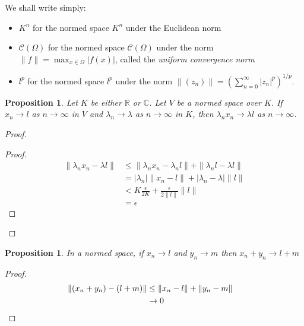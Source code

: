 \documentclass{book}
\let\qed\relax
\newtheorem{prop}[ax]{Proposition}
\theoremstyle{definition}
\begin{document}
We shall write simply:
\begin{itemize}
\item $K^n$ for the normed space $K^n$ under the Euclidean norm
\item $\mathcal{C}(\Omega)$ for the normed space $\mathcal{C}(\Omega)$ under the norm $\| f \| = \max_{x \in \Omega} |f(x)|$, called the \emph{uniform convergence norm}
\item $l^p$ for the normed space $l^p$ under the norm $\| (z_n) \| = \left( \sum_{n=0}^\infty |z_n|^p \right)^{1/p}$.
\end{itemize}

\begin{prop}
Let $K$ be either $\mathbb{R}$ or $\mathbb{C}$.
Let $V$ be a normed space over $K$. If $x_n \rightarrow l$ as $n \rightarrow \infty$ in $V$ and $\lambda_n \rightarrow \lambda$ as $n \rightarrow \infty$ in $K$, then $\lambda_n x_n \rightarrow \lambda l$ as $n \rightarrow \infty$.
\end{prop}

\begin{proof}
\pf
{}
\begin{proof}
	\pf
	\begin{align*}
		\| \lambda_n x_n - \lambda l \| & \leq \| \lambda_n x_n - \lambda_n l \| + \| \lambda_n l - \lambda l \| \\
		& = |\lambda_n| \| x_n - l \| + | \lambda_n - \lambda | \|l\| \\
		& < K \frac{\epsilon}{2K} + \frac{\epsilon}{2 \|l\|} \|l\| \\
		& = \epsilon
	\end{align*}
\end{proof}
\qed
\end{proof}

\begin{prop}
In a normed space, if $x_n \rightarrow l$ and $y_n \rightarrow m$ then $x_n + y_n \rightarrow l + m$
\end{prop}

\begin{proof}
\pf
\begin{align*}
\| (x_n + y_n) - (l + m) \| & \leq \| x_n - l \| + \| y_n - m \| \\
& \rightarrow 0 & \qed
\end{align*}
\end{proof}
\end{document}
